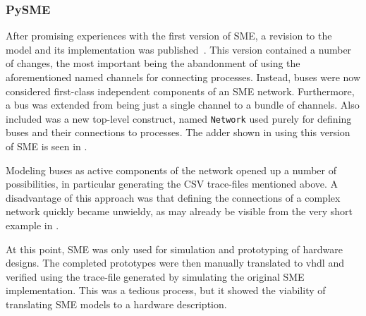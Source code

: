 \subsubsection{ PySME}
\label{sec:sme2}
After promising experiences with the first version of SME, a revision to the
model and its implementation was published~\cite{vinter2015bus}. This version
contained a number of changes, the most important being the abandonment of using
the aforementioned named channels for connecting processes. Instead, buses were
now considered first-class independent components of an SME
network. Furthermore, a bus was extended from being just a single channel to a
bundle of channels. Also included was a new top-level construct, named
\texttt{Network} used purely for defining buses and their connections to
processes. The adder shown in  using this version of SME is seen
in .

Modeling buses as active components of the network opened up a number of
possibilities, in particular generating the CSV trace-files mentioned above. A
disadvantage of this approach was that defining the connections of a complex
network quickly became unwieldy, as may already be visible from the very short
example in .

At this point, SME was only used for simulation and prototyping of hardware
designs. The completed prototypes were then manually translated to \gls{vhdl}
and verified using the trace-file generated by simulating the original SME
implementation. This was a tedious process, but it showed the viability of
translating SME models to a hardware description.



